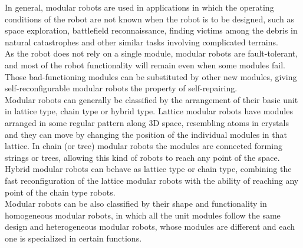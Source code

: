 In general, modular robots are used in applications in which the operating conditions of the robot are not known when the robot is to be designed, such as space exploration, battlefield reconnaissance, finding victims among the debris in natural catastrophes and other similar tasks involving complicated terrains.\\

As the robot does not rely on a single module, modular robots are fault-tolerant, and most of the robot functionality will remain even when some modules fail. Those bad-functioning modules can be substituted by other new modules, giving self-reconfigurable modular robots the property of self-repairing.\\

Modular robots can generally be classified by the arrangement of their basic unit in lattice type, chain type or hybrid type. Lattice modular robots have modules arranged in some regular pattern along 3D space, resembling atoms in crystals and they can move by changing the position of the individual modules in that lattice. In chain (or tree) modular robots the modules are connected forming strings or trees, allowing this kind of robots to reach any point of the space. Hybrid modular robots can behave as lattice type or chain type, combining the fast reconfiguration of the lattice modular robots with the ability of reaching any point of the chain type robots.\\

Modular robots can be also classified by their shape and functionality in homogeneous modular robots, in which all the unit modules follow the same design and heterogeneous modular robots, whose modules are different and each one is specialized in certain functions.\\

